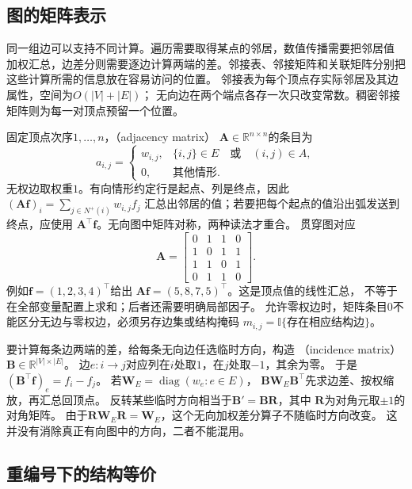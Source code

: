 \subsection{图的矩阵表示}
\label{sec:graph-theory-matrix-representations}

同一组边可以支持不同计算。遍历需要取得某点的邻居，数值传播需要把邻居值
加权汇总，边差分则需要逐边计算两端的差。邻接表、邻接矩阵和关联矩阵分别把
这些计算所需的信息放在容易访问的位置。
邻接表为每个顶点存实际邻居及其边属性，空间为\(O(|V|+|E|)\)；
无向边在两个端点各存一次只改变常数。稠密邻接矩阵则为每一对顶点预留一个位置。

固定顶点次序\(1,\ldots,n\)，（adjacency matrix）
\(\bm A\in\mathbb R^{n\times n}\)的条目为
\[
  a_{i,j}=
  \begin{cases}
    w_{i,j},&\{i,j\}\in E\quad\text{或}\quad(i,j)\in A,\\
    0,&\text{其他情形}.
  \end{cases}
\]
无权边取权重\(1\)。有向情形约定行是起点、列是终点，因此
\((\bm A\bm f)_i=\sum_{j\in N^+(i)}w_{i,j}f_j\)
汇总出邻居的值；若要把每个起点的值沿出弧发送到终点，应使用
\(\bm A^\top\bm f\)。无向图中矩阵对称，两种读法才重合。
贯穿图对应
\begin{equation}
  \bm A=
  \begin{bmatrix}
    0&1&1&0\\
    1&0&1&1\\
    1&1&0&1\\
    0&1&1&0
  \end{bmatrix}.
  \label{eq:graph-theory-running-adjacency}
\end{equation}
例如\(\bm f=(1,2,3,4)^\top\)给出
\(\bm A\bm f=(5,8,7,5)^\top\)。这是顶点值的线性汇总，
不等于在全部变量配置上求和；后者还需要明确局部因子。
允许零权边时，矩阵条目\(0\)不能区分无边与零权边，必须另存边集或结构掩码
\(m_{i,j}=\mathbb I\{\text{存在相应结构边}\}\)。

要计算每条边两端的差，给每条无向边任选临时方向，构造
（incidence matrix）
\(\bm B\in\mathbb R^{|V|\times|E|}\)。
边\(e:i\to j\)对应列在\(i\)处取\(1\)，在\(j\)处取\(-1\)，其余为零。
于是\((\bm B^\top\bm f)_e=f_i-f_j\)。
若\(\bm W_E=\operatorname{diag}(w_e:e\in E)\)，
\(\bm B\bm W_E\bm B^\top\)先求边差、按权缩放，再汇总回顶点。
反转某些临时方向相当于\(\bm B'=\bm B\bm R\)，其中
\(\bm R\)为对角元取\(\pm1\)的对角矩阵。
由于\(\bm R\bm W_E\bm R=\bm W_E\)，这个无向加权差分算子不随临时方向改变。
这并没有消除真正有向图中的方向，二者不能混用。

\subsection{重编号下的结构等价}
\label{sec:graph-theory-graph-isomorphism}

